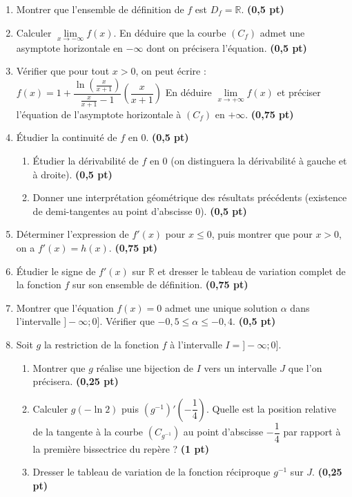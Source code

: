 \documentclass[12pt,a4paper]{article}
\begin{document}
\begin{enumerate}
    \item Montrer que l'ensemble de définition de $f$ est $D_f = \mathbb{R}$. \hfill \textbf{(0,5 pt)}
    
    \item Calculer $\lim\limits_{x \to -\infty} f(x)$. En déduire que la courbe $(C_f)$ admet une asymptote horizontale en $-\infty$ dont on précisera l'équation. \hfill \textbf{(0,5 pt)}
    
    \item Vérifier que pour tout $x > 0$, on peut écrire :
    $f(x) = 1 + \dfrac{\ln\left(\frac{x}{x+1}\right)}{\frac{x}{x+1}-1}\left(\dfrac{x}{x+1}\right)$
    En déduire $\lim\limits_{x \to +\infty} f(x)$ et préciser l'équation de l'asymptote horizontale à $(C_f)$ en $+\infty$. \hfill \textbf{(0,75 pt)}
    
    \item Étudier la continuité de $f$ en $0$. \hfill \textbf{(0,5 pt)}
    \begin{enumerate}
        \item Étudier la dérivabilité de $f$ en $0$ (on distinguera la dérivabilité à gauche et à droite). \hfill \textbf{(0,5 pt)}
        \item Donner une interprétation géométrique des résultats précédents (existence de demi-tangentes au point d'abscisse $0$). \hfill \textbf{(0,5 pt)}
    \end{enumerate}
    
    \item Déterminer l'expression de $f'(x)$ pour $x \le 0$, puis montrer que pour $x > 0$, on a $f'(x) = h(x)$. \hfill \textbf{(0,75 pt)}
    
    \item Étudier le signe de $f'(x)$ sur $\mathbb{R}$ et dresser le tableau de variation complet de la fonction $f$ sur son ensemble de définition. \hfill \textbf{(0,75 pt)}
    
    \item Montrer que l'équation $f(x) = 0$ admet une unique solution $\alpha$ dans l'intervalle $]-\infty ; 0]$. Vérifier que $-0,5 \le \alpha \le -0,4$. \hfill \textbf{(0,5 pt)}
    
    \item Soit $g$ la restriction de la fonction $f$ à l'intervalle $I = ]-\infty ; 0]$.
    \begin{enumerate}
        \item Montrer que $g$ réalise une bijection de $I$ vers un intervalle $J$ que l'on précisera. \hfill \textbf{(0,25 pt)}
        \item Calculer $g(-\ln 2)$ puis $(g^{-1})'\left(-\dfrac{1}{4}\right)$. Quelle est la position relative de la tangente à la courbe $(C_{g^{-1}})$ au point d'abscisse $-\dfrac{1}{4}$ par rapport à la première bissectrice du repère ? \hfill \textbf{(1 pt)}
        \item Dresser le tableau de variation de la fonction réciproque $g^{-1}$ sur $J$. \hfill \textbf{(0,25 pt)}
    \end{enumerate}
    

\end{enumerate}
\end{document}

